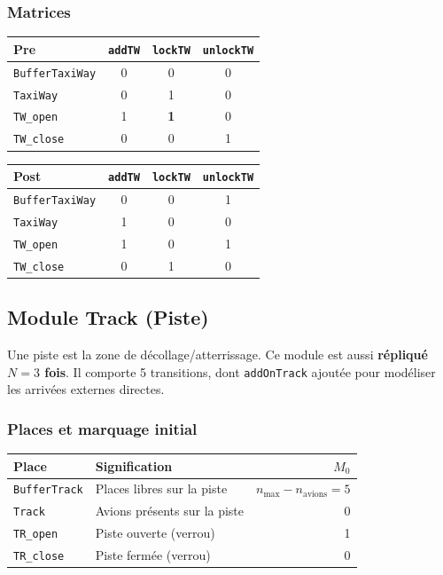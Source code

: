 \documentclass[a4paper,12pt]{article}
\begin{document}
\subsubsection{Matrices}
\begin{center}
\begin{tabular}{l|ccc}
\toprule
\textbf{Pre} & \texttt{addTW} & \texttt{lockTW} & \texttt{unlockTW} \\
\midrule
\texttt{BufferTaxiWay} & 0 & 0 & 0 \\
\texttt{TaxiWay}       & 0 & 1 & 0 \\
\texttt{TW\_open}      & 1 & \textbf{1} & 0 \\
\texttt{TW\_close}     & 0 & 0 & 1 \\
\bottomrule
\end{tabular}
\hspace{1cm}
\begin{tabular}{l|ccc}
\toprule
\textbf{Post} & \texttt{addTW} & \texttt{lockTW} & \texttt{unlockTW} \\
\midrule
\texttt{BufferTaxiWay} & 0 & 0 & 1 \\
\texttt{TaxiWay}       & 1 & 0 & 0 \\
\texttt{TW\_open}      & 1 & 0 & 1 \\
\texttt{TW\_close}     & 0 & 1 & 0 \\
\bottomrule
\end{tabular}
\end{center}

\subsection{Module Track (Piste)}

Une piste est la zone de décollage/atterrissage. Ce module est aussi
\textbf{répliqué $N=3$ fois}. Il comporte 5 transitions, dont \texttt{addOnTrack}
ajoutée pour modéliser les arrivées externes directes.

\subsubsection{Places et marquage initial}
\begin{center}
\begin{tabular}{llr}
\toprule
\textbf{Place} & \textbf{Signification} & $M_0$ \\
\midrule
\texttt{BufferTrack} & Places libres sur la piste & $n_{\max} - n_{\mathrm{avions}} = 5$ \\
\texttt{Track}       & Avions présents sur la piste & 0 \\
\texttt{TR\_open}    & Piste ouverte (verrou) & 1 \\
\texttt{TR\_close}   & Piste fermée (verrou)  & 0 \\
\bottomrule
\end{tabular}
\end{center}
\end{document}

